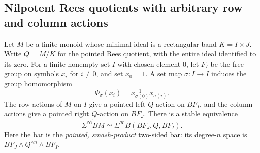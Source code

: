\subsection{Nilpotent Rees quotients with arbitrary row and column actions}

\begin{proposition}\label{E:band-free-group-bar}
Let $M$ be a finite monoid whose minimal ideal is a rectangular band
$K=I\times J$.  Write $Q=M/K$ for the pointed Rees quotient, with the
entire ideal identified to its zero.  For a finite nonempty set $I$
with chosen element $0$, let $F_I$ be the free group on symbols $x_i$
for $i\ne0$, and set $x_0=1$.  A set map $\sigma:I\to I$ induces the
group homomorphism
\[
 \Phi_\sigma(x_i)=x_{\sigma(0)}^{-1}x_{\sigma(i)}.       \tag{E.26}
\]
The row actions of $M$ on $I$ give a pointed left $Q$-action on $BF_I$,
and the column actions give a pointed right $Q$-action on $BF_J$.
There is a stable equivalence
\[
 \widetilde{\Sigma^\infty BM}\simeq
 \Sigma^\infty B(BF_J,Q,BF_I).                         \tag{E.27}
\]
Here the bar is the \emph{pointed, smash-product} two-sided bar: its
degree-$n$ space is $BF_J\wedge Q^{\wedge n}\wedge BF_I$.
\end{proposition}

